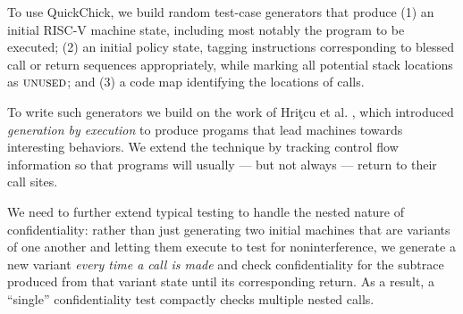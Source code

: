 \documentclass[10pt,conference]{ieeetran}%
\theoremstyle{definition}
\begin{document}
{To use QuickChick, we build random test-case generators that produce
(1) an initial RISC-V machine state, including most notably
  the program to be executed;
(2)
  an initial policy state, tagging instructions corresponding to
  blessed call or return sequences appropriately, while marking
  all potential stack locations as $\textsc{unused}$; and
(3)
 a code map identifying the locations of calls.

To write such generators we build on the work of
Hri\c{t}cu et al. \cite{TestingNI:ICFP, DBLP:journals/jfp/HritcuLSADHPV16}, which
introduced {\em generation by execution} to produce progams that lead
machines towards interesting behaviors. We extend the technique by tracking
control flow information so that programs will usually --- but not always ---
return to their call sites.

%
%
%
We need to further extend typical testing to handle the nested
nature of confidentiality: rather than just generating two
initial machines that are variants of one another and letting them
execute to test for noninterference, we generate a new variant
{\em every time a call is made} and check confidentiality for the
subtrace produced from that variant state until its corresponding
return. As a result, a ``single'' confidentiality test compactly
checks multiple nested calls.

}
\end{document}
